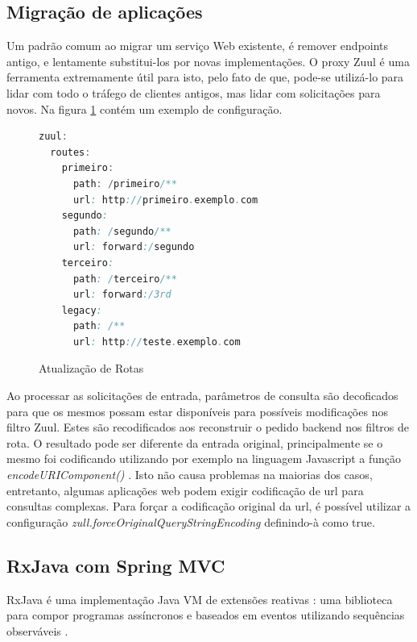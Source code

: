 \documentclass[journal]{IEEEtran}
\begin{document}
\subsection{Migração de aplicações}

Um padrão comum ao migrar um serviço Web existente, é remover endpoints antigo, e lentamente substitui-los por novas implementações. O proxy Zuul é uma ferramenta extremamente útil para isto, pelo fato de que, pode-se utilizá-lo para lidar com todo o tráfego de clientes antigos, mas lidar com solicitações para novos. Na figura \ref{alg:vinteum} contém um exemplo de configuração.

\begin{figure}[h]
\centering

\begin{lstlisting}[language=Java]
 zuul:
  routes:
    primeiro:
      path: /primeiro/**
      url: http://primeiro.exemplo.com
    segundo:
      path: /segundo/**
      url: forward:/segundo
    terceiro:
      path: /terceiro/**
      url: forward:/3rd
    legacy:
      path: /**
      url: http://teste.exemplo.com
\end{lstlisting}

\caption{Atualização de Rotas}
\label{alg:vinteum}
\end{figure}

Ao processar as solicitações de entrada, parâmetros de consulta são  decoficados para que os mesmos possam estar disponíveis para possíveis modificações nos filtro Zuul. Estes são recodificados aos reconstruir o pedido backend nos filtros de rota. O resultado pode ser diferente da entrada original, principalmente se o mesmo foi codificando utilizando por exemplo na linguagem Javascript a função \emph{encodeURIComponent()}
. Isto não causa problemas na maiorias dos casos, entretanto, algumas aplicações web podem exigir codificação de url para consultas complexas. Para forçar a codificação original da url, é possível utilizar a configuração \emph{zull.forceOriginalQueryStringEncoding} definindo-à como true.


\subsection{RxJava com Spring MVC}

RxJava é uma implementação Java VM de extensões reativas : uma biblioteca para compor programas assíncronos e baseados em eventos utilizando sequências observáveis \cite{reactivex2017}.
\end{document}
